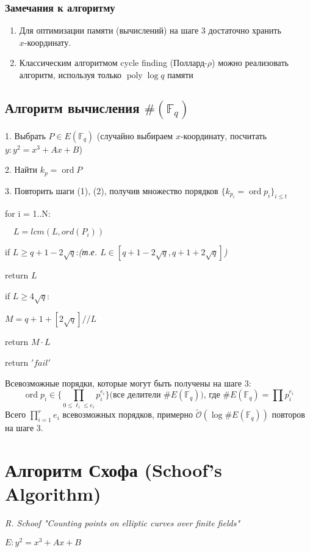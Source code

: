 \documentclass[12pt]{article}
\newcommand{\F}{{{\mathbb F}}}
\newcommand{\bigO}{\mathcal{O}}
\newcommand{\softO}{\widetilde{\bigO}}
\theoremstyle{definition}
\theoremstyle{definition}
\theoremstyle{definition}
\begin{document}
\subsubsection{Замечания к алгоритму}
\begin{enumerate}
    \item Для оптимизации памяти (вычислений) на шаге 3 достаточно хранить\\ $x$-координату.
    \item Классическим алгоритмом cycle finding (Поллард-$\rho$) можно реализовать алгоритм, используя только $\operatorname{poly} \log q$ памяти
\end{enumerate}

\subsection{Алгоритм вычисления $\#(\F_q)$}
1. Выбрать $P \in E(\F_q)$ (случайно выбираем $x$-координату, посчитать $y: y^2 = x^3 + Ax+B$)

2. Найти $k_p = \operatorname{ord}P$

3. Повторить шаги (1), (2), получив множество порядков $\{k_{p_i} = \operatorname{ord} p_i\}_{i\leq t}$

for i = 1..N:

$\quad L = lcm(L, ord(P_i))$

\quad if $L \geq q+1-2\sqrt{q}$:\quad\quad \textit{(т.е. $L \in \left[q+1-2\sqrt{q}, q+1+2\sqrt{q} \right]$)}

\quad \quad return $L$

\quad if $L \geq 4\sqrt{q}$:

\quad \quad $M = q+1+[2\sqrt{q}] // L$

\quad \quad return $M\cdot L$

return $'fail'$

Всевозможные порядки, которые могут быть получены на шаге 3:
\[
    \operatorname{ord} p_i \in \{\prod_{0 \leq \ell_i \leq e_i} p_i^{e_i}\} \text{(все делители } \#E(\F_q)) \text{, где } \#E(\F_q) = \prod p_i^{e_i}
\]
Всего $\prod_{i=1}^r e_i$ всевозможных порядков, примерно $\softO(\log \#E(\F_q))$ повторов на шаге 3.

\section{Алгоритм Схофа (Schoof's Algorithm)}
\textit{R. Schoof "Counting points on elliptic curves over finite fields"}

$E: y^2 = x^3 + Ax + B$
\end{document}
